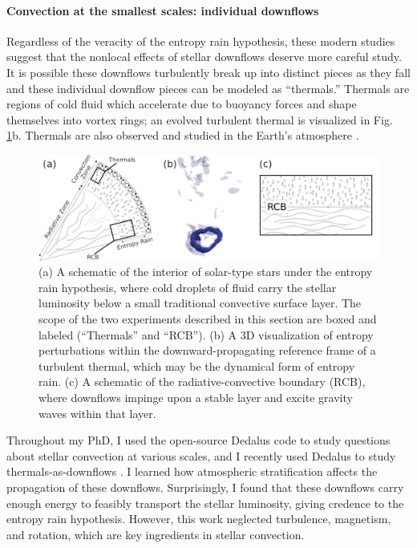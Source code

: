 \documentclass[preprint, hmargin=1in, vmargin=1in]{aastex62}
\begin{document}
\paragraph{Convection at the smallest scales: individual downflows} 
Regardless of the veracity of the entropy rain hypothesis, these modern studies suggest that the nonlocal effects of stellar downflows deserve more careful study.
It is possible these downflows turbulently break up into distinct pieces as they fall and these individual downflow pieces can be modeled as ``thermals.''
Thermals are regions of cold fluid which accelerate due to buoyancy forces and shape themselves into vortex rings; an evolved turbulent thermal is visualized in Fig. \ref{fig:tri_panel}b.
Thermals are also observed and studied in the Earth's atmosphere \citep{lecoanet&jeevanjee2019}.

\begin{figure}[t]
    \includegraphics[width=\textwidth]{./figs/tri_panel.png}
    \caption{ (a) A schematic of the interior of solar-type stars under the entropy rain hypothesis, where cold droplets of fluid carry the stellar luminosity below a small traditional convective surface layer.
	The scope of the two experiments described in this section are boxed and labeled (``Thermals'' and ``RCB'').
	(b) A 3D visualization of entropy perturbations within the downward-propagating reference frame of a turbulent thermal, which may be the dynamical form of entropy rain.
	(c) A schematic of the radiative-convective boundary (RCB), where downflows impinge upon a stable layer and excite gravity waves within that layer.
	\label{fig:tri_panel} }
\end{figure}


Throughout my PhD, I used the open-source Dedalus \citep{burns&all2019} code to study questions about stellar convection at various scales, and I recently used Dedalus to study thermals-as-downflows \citep{andersLB2019}.
I learned how atmospheric stratification affects the propagation of these downflows.
Surprisingly, I found that these downflows carry enough energy to feasibly transport the stellar luminosity, giving credence to the entropy rain hypothesis.
However, this work neglected turbulence, magnetism, and rotation, which are key ingredients in stellar convection.
\end{document}
